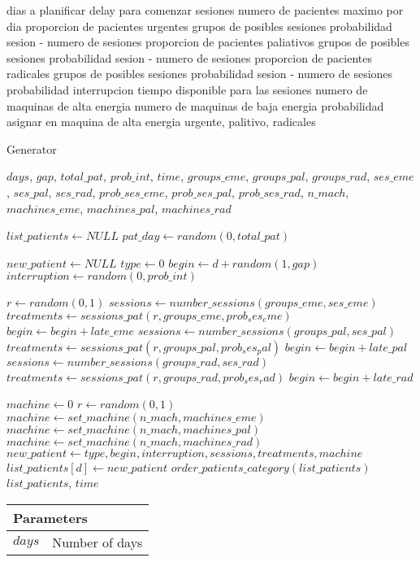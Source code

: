dias a planificar
delay para comenzar sesiones
numero de pacientes maximo por dia
proporcion de pacientes urgentes
  grupos de posibles sesiones
    probabilidad sesion - numero de sesiones
proporcion de pacientes paliativos
  grupos de posibles sesiones
    probabilidad sesion - numero de sesiones
proporcion de pacientes radicales
  grupos de posibles sesiones
    probabilidad sesion - numero de sesiones
probabilidad interrupcion
tiempo disponible para las sesiones
numero de maquinas de alta energia
numero de maquinas de baja energia
probabilidad asignar en maquina de alta energia urgente, palitivo, radicales

\renewcommand{\algorithmicrequire}{\textbf{Input:}}

\begin{algorithm}
\caption{Generator}
\begin{algorithmic}[1]
\Require $days$, $gap$, $total\_pat$, $prob\_int$, $time$, $groups\_eme$, $groups\_pal$, $groups\_rad$, $ses\_eme$, $ses\_pal$, $ses\_rad$, $prob\_ses\_eme$, $prob\_ses\_pal$, $prob\_ses\_rad$, $n\_mach$, $machines\_eme$, $machines\_pal$, $machines\_rad$

\State $list\_patients \gets NULL$
\State $pat\_day \gets random(0, total\_pat)$

	    \State $new\_patient \gets NULL$
	    \State $type \gets 0$
	    \State $begin \gets d + random(1, gap)$
	    \State $interruption \gets random(0, prob\_int)$
	    
	    \State $r \gets random(0,1)$
		\State $sessions \gets number\_sessions(groups\_eme, ses\_eme)$
		\State $treatments \gets sessions\_pat(r, groups\_eme, prob_ses_eme)$
		\State $begin \gets begin + late\_eme$
		\State $sessions \gets number\_sessions(groups\_pal, ses\_pal)$
		\State $treatments \gets sessions\_pat(r, groups\_pal, prob_ses_pal)$
		\State $begin \gets begin + late\_pal$
	    \Else
		\State $sessions \gets number\_sessions(groups\_rad, ses\_rad)$
		\State $treatments \gets sessions\_pat(r, groups\_rad, prob_ses_rad)$
		\State $begin \gets begin + late\_rad$
	    \EndIf

	    \State $machine \gets 0$
	    \State $r \gets random(0,1)$
		  \State $machine \gets set\_machine(n\_mach, machines\_eme)$
		  \State $machine \gets set\_machine(n\_mach, machines\_pal)$
		  \State $machine \gets set\_machine(n\_mach, machines\_rad)$
	     \EndIf
	     \State
	     \State $new\_patient \gets type, begin, interruption, sessions, treatments, machine$
	     \State $list\_patients[d] \gets new\_patient$
	     \State $order\_patients\_category(list\_patients)$
      \EndFor
      \State \Return $list\_patients$, $time$
\EndFor

\EndProcedure
\end{algorithmic}
\end{algorithm}

\begin{tabular}{ll}
\hline
 \multicolumn{2}{l}{Parameters}\\
 \hline
 $days$ & Number of days\\
\end{tabular}
